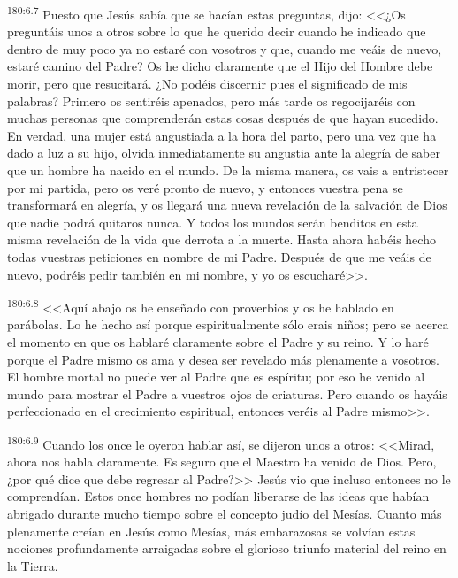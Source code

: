 \par 
\textsuperscript{180:6.7} Puesto que Jesús sabía que se hacían estas preguntas, dijo: <<¿Os preguntáis unos a otros sobre lo que he querido decir cuando he indicado que dentro de muy poco ya no estaré con vosotros y que, cuando me veáis de nuevo, estaré camino del Padre? Os he dicho claramente que el Hijo del Hombre debe morir, pero que resucitará. ¿No podéis discernir pues el significado de mis palabras? Primero os sentiréis apenados, pero más tarde os regocijaréis con muchas personas que comprenderán estas cosas después de que hayan sucedido. En verdad, una mujer está angustiada a la hora del parto, pero una vez que ha dado a luz a su hijo, olvida inmediatamente su angustia ante la alegría de saber que un hombre ha nacido en el mundo. De la misma manera, os vais a entristecer por mi partida, pero os veré pronto de nuevo, y entonces vuestra pena se transformará en alegría, y os llegará una nueva revelación de la salvación de Dios que nadie podrá quitaros nunca. Y todos los mundos serán benditos en esta misma revelación de la vida que derrota a la muerte. Hasta ahora habéis hecho todas vuestras peticiones en nombre de mi Padre. Después de que me veáis de nuevo, podréis pedir también en mi nombre, y yo os escucharé>>.

\par 
\textsuperscript{180:6.8} <<Aquí abajo os he enseñado con proverbios y os he hablado en parábolas. Lo he hecho así porque espiritualmente sólo erais niños; pero se acerca el momento en que os hablaré claramente sobre el Padre y su reino. Y lo haré porque el Padre mismo os ama y desea ser revelado más plenamente a vosotros. El hombre mortal no puede ver al Padre que es espíritu; por eso he venido al mundo para mostrar el Padre a vuestros ojos de criaturas. Pero cuando os hayáis perfeccionado en el crecimiento espiritual, entonces veréis al Padre mismo>>.

\par 
\textsuperscript{180:6.9} Cuando los once le oyeron hablar así, se dijeron unos a otros: <<Mirad, ahora nos habla claramente. Es seguro que el Maestro ha venido de Dios. Pero, ¿por qué dice que debe regresar al Padre?>> Jesús vio que incluso entonces no le comprendían. Estos once hombres no podían liberarse de las ideas que habían abrigado durante mucho tiempo sobre el concepto judío del Mesías. Cuanto más plenamente creían en Jesús como Mesías, más embarazosas se volvían estas nociones profundamente arraigadas sobre el glorioso triunfo material del reino en la Tierra.